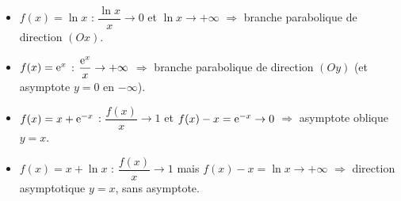 \begin{exemple}
	\begin{itemize}[label=\textbullet]
		\item $f(x)=\ln x$ : $\dfrac{\ln x}{x}\to 0$ et $\ln x\to+\infty$
		$\Rightarrow$ branche parabolique de direction $(Ox)$.
		\item $f(x)=\mathrm{e}^{x}$ : $\dfrac{\mathrm{e}^{x}}{x}\to+\infty$ $\Rightarrow$ branche
		parabolique de direction $(Oy)$ (et asymptote $y=0$ en $-\infty$).
		\item $f(x)=x+\mathrm{e}^{-x}$ : $\dfrac{f(x)}{x}\to 1$ et $f(x)-x=\mathrm{e}^{-x}\to 0$
		$\Rightarrow$ asymptote oblique $y=x$.
		\item $f(x)=x+\ln x$ : $\dfrac{f(x)}{x}\to 1$ mais $f(x)-x=\ln x\to+\infty$
		$\Rightarrow$ direction asymptotique $y=x$, sans asymptote.
	\end{itemize}
\end{exemple}

